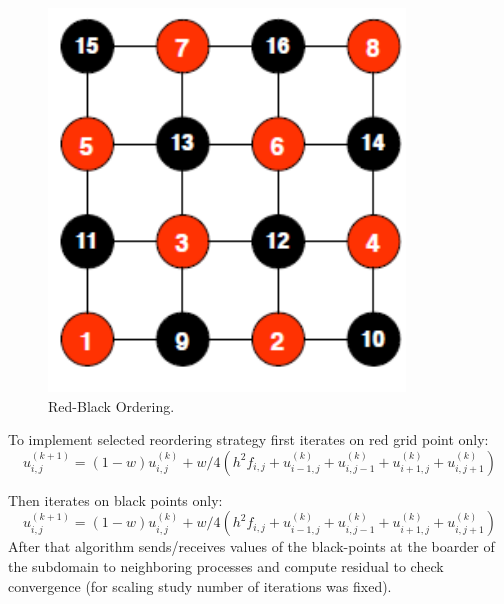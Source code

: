 \documentclass{anstrans}
\begin{document}
\begin{figure}[thbp!] %
  \centering
  \vspace{-0.3em}
  \includegraphics[width=0.75\linewidth]{red-black-ordering.png}
  \caption{Red-Black Ordering.}
  \vspace{-0.6em}
  \label{fig:stencil_red_black}
\end{figure}
\FloatBarrier

To implement selected reordering strategy first iterates on red grid point only:
\begin{equation}
u_{i,j}^{(k+1)} = (1-w)u_{i,j}^{(k)} + w/4 (h^2f_{i,j} + u_{i-1,j}^{(k)} + u_{i,j-1}^{(k)} + u_{i+1,j}^{(k)} + u_{i,j+1}^{(k)})
\end{equation}

Then iterates on black 	points only:
\begin{equation}
u_{i,j}^{(k+1)} = (1-w)u_{i,j}^{(k)} + w/4 (h^2f_{i,j} + u_{i-1,j}^{(k)} + u_{i,j-1}^{(k)} + u_{i+1,j}^{(k)} + u_{i,j+1}^{(k)})
\end{equation}
After that algorithm sends/receives values of the black-points at the boarder of the subdomain to neighboring processes and compute residual to check convergence (for scaling study number of iterations was fixed).
\end{document}
